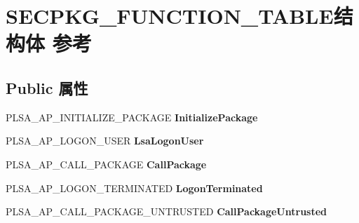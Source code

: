 \hypertarget{struct_s_e_c_p_k_g___f_u_n_c_t_i_o_n___t_a_b_l_e}{}\section{S\+E\+C\+P\+K\+G\+\_\+\+F\+U\+N\+C\+T\+I\+O\+N\+\_\+\+T\+A\+B\+L\+E结构体 参考}
\label{struct_s_e_c_p_k_g___f_u_n_c_t_i_o_n___t_a_b_l_e}
\subsection*{Public 属性}
\begin{DoxyCompactItemize}
\item 
\mbox{\label{struct_s_e_c_p_k_g___f_u_n_c_t_i_o_n___t_a_b_l_e_af1fc9473ee1b41c8f1abae47fa1641ec}} 
P\+L\+S\+A\+\_\+\+A\+P\+\_\+\+I\+N\+I\+T\+I\+A\+L\+I\+Z\+E\+\_\+\+P\+A\+C\+K\+A\+GE {\bfseries Initialize\+Package}
\item 
\mbox{\label{struct_s_e_c_p_k_g___f_u_n_c_t_i_o_n___t_a_b_l_e_a296b4b183652d0d7145a6bdbfbc2f3be}} 
P\+L\+S\+A\+\_\+\+A\+P\+\_\+\+L\+O\+G\+O\+N\+\_\+\+U\+S\+ER {\bfseries Lsa\+Logon\+User}
\item 
\mbox{\label{struct_s_e_c_p_k_g___f_u_n_c_t_i_o_n___t_a_b_l_e_a8cb1e81307934d921d8f0e758bf4bf88}} 
P\+L\+S\+A\+\_\+\+A\+P\+\_\+\+C\+A\+L\+L\+\_\+\+P\+A\+C\+K\+A\+GE {\bfseries Call\+Package}
\item 
\mbox{\label{struct_s_e_c_p_k_g___f_u_n_c_t_i_o_n___t_a_b_l_e_a2e435ac911a399010373b5619bc3b3de}} 
P\+L\+S\+A\+\_\+\+A\+P\+\_\+\+L\+O\+G\+O\+N\+\_\+\+T\+E\+R\+M\+I\+N\+A\+T\+ED {\bfseries Logon\+Terminated}
\item 
\mbox{\label{struct_s_e_c_p_k_g___f_u_n_c_t_i_o_n___t_a_b_l_e_a8d0ce2dc58874a4ecbf281c5c5f4b269}} 
P\+L\+S\+A\+\_\+\+A\+P\+\_\+\+C\+A\+L\+L\+\_\+\+P\+A\+C\+K\+A\+G\+E\+\_\+\+U\+N\+T\+R\+U\+S\+T\+ED {\bfseries Call\+Package\+Untrusted}
\item 
\mbox{\label{struct_s_e_c_p_k_g___f_u_n_c_t_i_o_n___t_a_b_l_e_add24bd477fff5cc46a5f09dc0fbe110c}} 

\end{DoxyCompactItemize}
